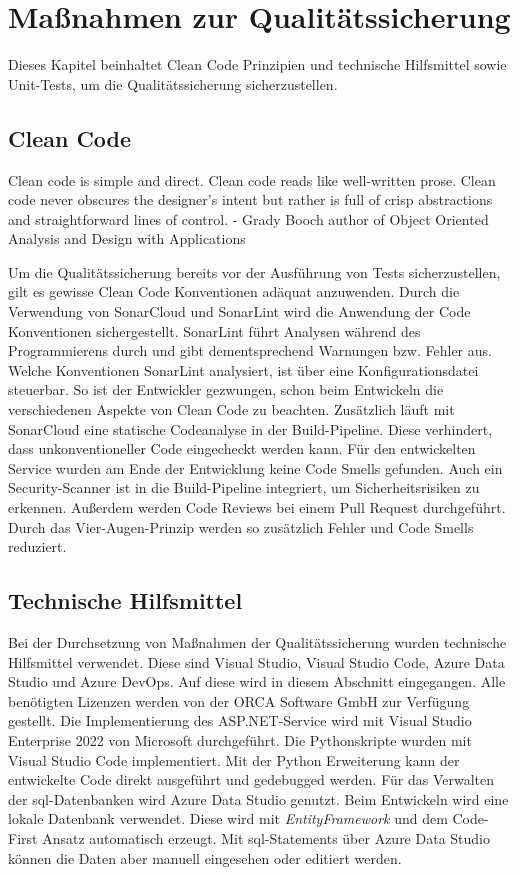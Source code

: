 \chapter{Maßnahmen zur Qualitätssicherung}
\label{c:qs}
Dieses Kapitel beinhaltet Clean Code Prinzipien und technische Hilfsmittel sowie Unit-Tests, um die Qualitätssicherung sicherzustellen.

\section{Clean Code}
\label{c:qs:cleancode}
\begin{definition}
	\label{def:clean-code}
	\glqq Clean code is simple and direct. Clean code reads like well-written prose. Clean code never obscures the designer’s intent but rather is full of crisp abstractions and straightforward lines of control. - Grady Booch author of Object Oriented Analysis and Design with	Applications\grqq{} \citep[p.~8]{martin2009clean}
\end{definition}
Um die Qualitätssicherung bereits vor der Ausführung von Tests sicherzustellen, gilt es gewisse Clean Code Konventionen adäquat anzuwenden.
Durch die Verwendung von SonarCloud und SonarLint wird die Anwendung der Code Konventionen sichergestellt. SonarLint führt Analysen während des Programmierens durch und gibt dementsprechend Warnungen bzw. Fehler aus. Welche Konventionen SonarLint analysiert, ist über eine Konfigurationsdatei steuerbar. So ist der Entwickler gezwungen, schon beim Entwickeln die verschiedenen Aspekte von Clean Code zu beachten. Zusätzlich läuft mit SonarCloud eine statische Codeanalyse in der Build-Pipeline. Diese verhindert, dass unkonventioneller Code eingecheckt werden kann. Für den entwickelten Service wurden am Ende der Entwicklung keine Code Smells gefunden. Auch ein Security-Scanner ist in die Build-Pipeline integriert, um Sicherheitsrisiken zu erkennen. Außerdem werden Code Reviews bei einem Pull Request durchgeführt. Durch das Vier-Augen-Prinzip werden so zusätzlich Fehler und Code Smells reduziert.

\section{Technische Hilfsmittel}
\label{c:qs:technical_aids}
Bei der Durchsetzung von Maßnahmen der Qualitätssicherung wurden technische Hilfsmittel verwendet. Diese sind Visual Studio, Visual Studio Code, Azure Data Studio und Azure DevOps. Auf diese wird in diesem Abschnitt eingegangen. Alle benötigten Lizenzen werden von der \glqq ORCA Software GmbH\grqq{} zur Verfügung gestellt. Die Implementierung des ASP.NET-Service wird mit Visual Studio Enterprise 2022 von Microsoft durchgeführt. Die Pythonskripte wurden mit Visual Studio Code implementiert. Mit der \glqq Python\grqq{} Erweiterung kann der entwickelte Code direkt ausgeführt und gedebugged werden.
Für das Verwalten der \ac{sql}-Datenbanken wird Azure Data Studio genutzt. Beim Entwickeln wird eine lokale Datenbank verwendet. Diese wird mit \textit{EntityFramework} und dem Code-First Ansatz automatisch erzeugt. Mit \ac{sql}-Statements über Azure Data Studio können die Daten aber manuell eingesehen oder editiert werden.

